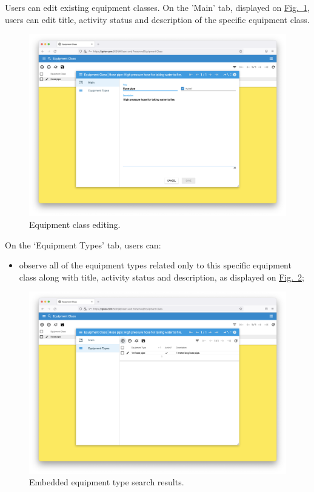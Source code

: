 \newpage
Users can edit existing equipment classes. On the 'Main' tab, displayed on \hyperref[sections/equipment/images/Fig.4]{Fig.~\ref*{sections/equipment/images/Fig.4}}, users can edit title, activity status and description of the specific equipment class.

    \begin{figure}[!htbp]
	\centering
	\includegraphics[width=0.95\linewidth]{sections/equipment/images/Fig.4.png}
	\caption{Equipment class editing.}\label{sections/equipment/images/Fig.4}
	\end{figure}

\newpage
On the ‘Equipment Types’ tab, users can:
\begin{itemize}
    \item observe all of the equipment types related only to this specific equipment class along with title, activity status and description, as displayed on \hyperref[sections/equipment/images/Fig.5]{Fig.~\ref*{sections/equipment/images/Fig.5}};
\end{itemize}

    \begin{figure}[!htbp]
	\centering
	\includegraphics[width=0.95\linewidth]{sections/equipment/images/Fig.5.png}
	\caption{Embedded equipment type search results.}\label{sections/equipment/images/Fig.5}
	\end{figure}
	
